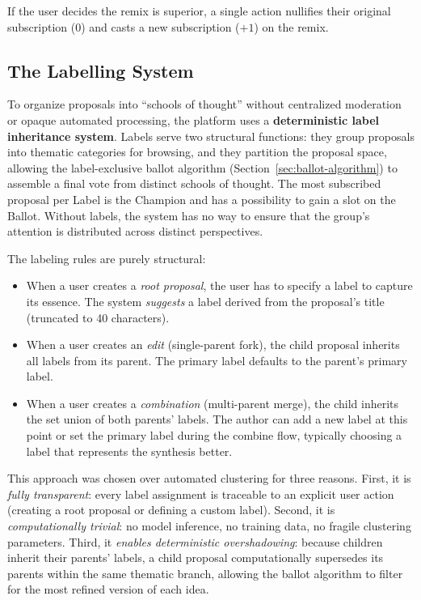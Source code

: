 \documentclass[a4paper, 12pt, twoside]{iviathesis}
\begin{document}
If the user decides the remix is superior, a single action nullifies their original subscription ($0$) and casts a new subscription ($+1$) on the remix. 

\subsection{The Labelling System}
\label{sec:labeling-system}

To organize proposals into ``schools of thought'' without centralized moderation or opaque automated processing, the platform uses a \textbf{deterministic label inheritance system}.
Labels serve two structural functions: they group proposals into thematic categories for browsing, and they partition the proposal space, allowing the label-exclusive ballot algorithm (Section~\ref{sec:ballot-algorithm}) to assemble a final vote from distinct schools of thought. The most subscribed proposal per Label is the Champion and has a possibility to gain a slot on the Ballot. Without labels, the system has no way to ensure that the group's attention is distributed across distinct perspectives.

The labeling rules are purely structural:
\begin{itemize}
    \item When a user creates a \textit{root proposal}, the user has to specify a label to capture its essence. The system \textit{suggests} a label derived from the proposal's title (truncated to 40 characters).
    \item When a user creates an \textit{edit} (single-parent fork), the child proposal inherits all labels from its parent. The primary label defaults to the parent's primary label.
    \item When a user creates a \textit{combination} (multi-parent merge), the child inherits the set union of both parents' labels. The author can add a new label at this point or set the primary label during the combine flow, typically choosing a label that represents the synthesis better.
\end{itemize}

This approach was chosen over automated clustering for three reasons. First, it is \textit{fully transparent}: every label assignment is traceable to an explicit user action (creating a root proposal or defining a custom label). Second, it is \textit{computationally trivial}: no model inference, no training data, no fragile clustering parameters. Third, it \textit{enables deterministic overshadowing}: because children inherit their parents' labels, a child proposal computationally supersedes its parents within the same thematic branch, allowing the ballot algorithm to filter for the most refined version of each idea.
\end{document}
